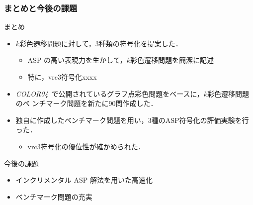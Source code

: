 \documentclass[dvipdfmx,11pt]{beamer}
\begin{document}
\begin{frame}\frametitle{まとめと今後の課題}

  \begin{block}{まとめ}
    \begin{itemize}
      \item $k$彩色遷移問題に対して，3種類の符号化を提案した．
      \begin{itemize}
      \item ASP の高い表現力を生かして，$k$彩色遷移問題を簡潔に記述
      \item 特に，vrc3符号化xxxx
      \end{itemize}
    \item \textit{COLOR04}~\footnotemark[1]
      で公開されているグラフ点彩色問題をベースに，$k$彩色遷移問題のベ
      ンチマーク問題を新たに90問作成した．
    \item 独自に作成したベンチマーク問題を用い，3種のASP符号化の評価実験を行った．
      \begin{itemize}
      \item vrc3符号化の優位性が確かめられた．
      \end{itemize}
    \end{itemize}
  \end{block}
  
  \begin{alertblock}{今後の課題}
    \begin{itemize}
      \item インクリメンタル ASP 解法を用いた高速化
      \item ベンチマーク問題の充実
    \end{itemize}
  \end{alertblock}

\end{frame}



\end{document}
